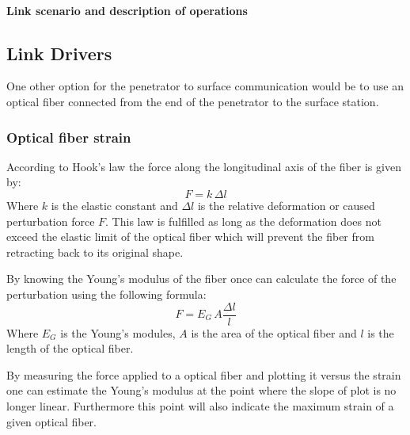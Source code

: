 
\paragraph{Link scenario and description of operations}




\subsection{Link Drivers}


One other option for the penetrator to surface communication would be to use an optical fiber connected from the end of the penetrator to the surface station.

\subsubsection{Optical fiber strain}

According to Hook's law the force along the longitudinal axis of the fiber is given by:
\begin{equation}
	 F = k \, \Delta l
\end{equation}
Where $k$ is the elastic constant and $\Delta l$ is the relative deformation or caused perturbation force $F$. This law is fulfilled as long as the deformation does not exceed the elastic limit of the optical fiber which will prevent the fiber from retracting back to its original shape.

By knowing the Young's modulus of the fiber once can calculate the force of the perturbation using the following formula:
\begin{equation}
	F = E_G \, A \frac{\Delta l}{l}
\end{equation}
Where $E_G$ is the Young's modules, $A$ is the area of the optical fiber and $l$ is the length of the optical fiber.

By measuring the force applied to a optical fiber and plotting it versus the strain one can estimate the Young's modulus at the point where the slope of plot is no longer linear. Furthermore this point will also indicate the maximum strain of a given optical fiber.

